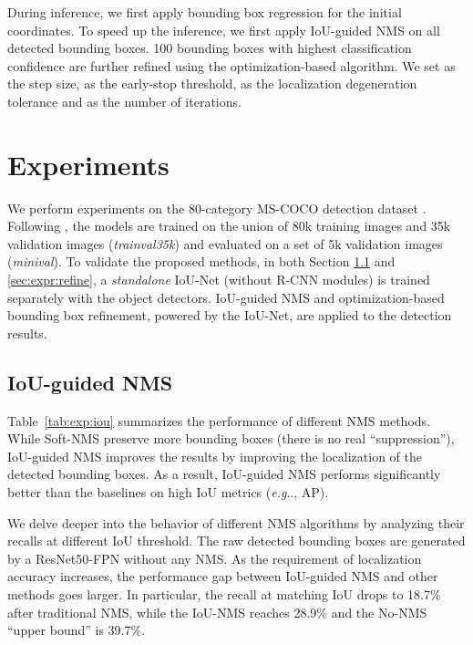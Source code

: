 \documentclass[runningheads]{llncs}
\makeatletter
\DeclareRobustCommand\onedot{\futurelet\@let@token\@onedot}
\def\@onedot{\ifx\@let@token.\else.\null\fi\xspace}
\def\eg{\emph{e.g}\onedot} \def\Eg{\emph{E.g}\onedot}
\makeatother
\begin{document}
During inference, we first apply bounding box regression for the initial coordinates. To speed up the inference, we first apply IoU-guided NMS on all detected bounding boxes. 100 bounding boxes with highest classification confidence are further refined using the optimization-based algorithm. 
We set  as the step size,  as the early-stop threshold,  as the localization degeneration tolerance and  as the number of iterations. \section{Experiments}
We perform experiments on the 80-category MS-COCO detection dataset \cite{lin2014microsoft}. Following \cite{bell2016inside,Lin_2017_CVPR}, the models are trained on the union of 80k training images and 35k validation images (\emph{trainval35k}) and evaluated on a set of 5k validation images (\emph{minival}). To validate the proposed methods, in both Section \ref{sec:expr:nms} and \ref{sec:expr:refine}, a \emph{standalone} IoU-Net (without R-CNN modules) is trained separately with the object detectors. IoU-guided NMS and optimization-based bounding box refinement, powered by the IoU-Net, are applied to the detection results.

\subsection{IoU-guided NMS}
\label{sec:expr:nms}
Table~\ref{tab:exp:iou} summarizes the performance of different NMS methods. While Soft-NMS preserve more bounding boxes (there is no real ``suppression''), IoU-guided NMS improves the results by improving the localization of the detected bounding boxes. As a result, IoU-guided NMS performs significantly better than the baselines on high IoU metrics (\eg, AP).

We delve deeper into the behavior of different NMS algorithms by analyzing their recalls at different IoU threshold. The raw detected bounding boxes are generated by a ResNet50-FPN without any NMS. As the requirement of localization accuracy increases, the performance gap between IoU-guided NMS and other methods goes larger. In particular, the recall at matching IoU  drops to 18.7\% after traditional NMS, while the IoU-NMS reaches 28.9\% and the No-NMS ``upper bound'' is 39.7\%.
\end{document}
